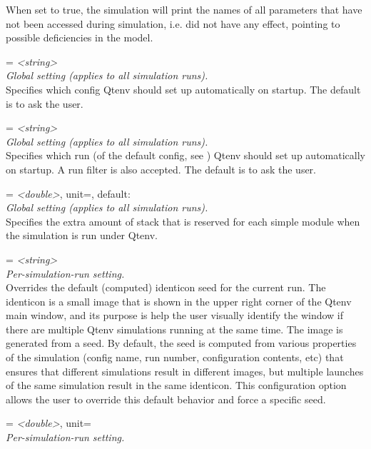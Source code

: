 \begin{description}
    When set to true, the simulation will print the names of all parameters
    that have not been accessed during simulation, i.e. did not have any
    effect, pointing to possible deficiencies in the model.
\item[qtenv-default-config] = \textit{<string>}\\
    \textit{Global setting (applies to all simulation runs).}\\
    Specifies which config Qtenv should set up automatically on startup. The
    default is to ask the user.
\item[qtenv-default-run] = \textit{<string>}\\
    \textit{Global setting (applies to all simulation runs).}\\
    Specifies which run (of the default config, see
    ) Qtenv should set up
    automatically on startup. A run filter is also accepted. The default is to
    ask the user.
\item[qtenv-extra-stack] = \textit{<double>}, unit=, default: \\
    \textit{Global setting (applies to all simulation runs).}\\
    Specifies the extra amount of stack that is reserved for each
     simple module when the simulation is run under Qtenv.
\item[qtenv-identicon-seed] = \textit{<string>}\\
    \textit{Per-simulation-run setting.}\\
    Overrides the default (computed) identicon seed for the current run. The
    identicon is a small image that is shown in the upper right corner of the
    Qtenv main window, and its purpose is help the user visually identify the
    window if there are multiple Qtenv simulations running at the same time.
    The image is generated from a seed. By default, the seed is computed from
    various properties of the simulation (config name, run number,
    configuration contents, etc) that ensures that different simulations result
    in different images, but multiple launches of the same simulation result in
    the same identicon. This configuration option allows the user to override
    this default behavior and force a specific seed.
\item[real-time-limit] = \textit{<double>}, unit=\\
    \textit{Per-simulation-run setting.}\\

\end{description}
